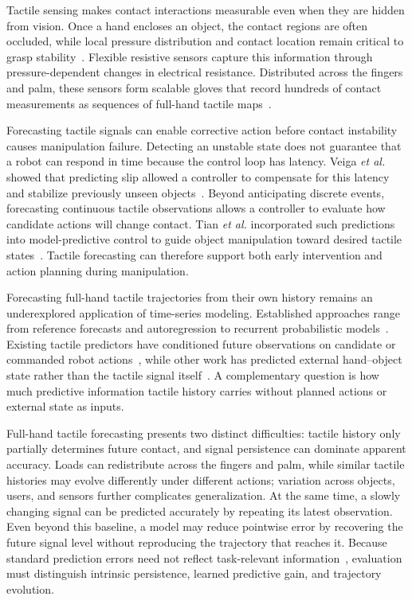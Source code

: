 \documentclass[letterpaper, 10 pt, conference]{ieeeconf}
\begin{document}
Tactile sensing makes contact interactions measurable even when they are hidden from vision. Once a hand encloses an object, the contact regions are often occluded, while local pressure distribution and contact location remain critical to grasp stability~\cite{kappassov2015tactile}. Flexible resistive sensors capture this information through pressure-dependent changes in electrical resistance. Distributed across the fingers and palm, these sensors form scalable gloves that record hundreds of contact measurements as sequences of full-hand tactile maps~\cite{sundaram2019glove}.

Forecasting tactile signals can enable corrective action before contact instability causes manipulation failure. Detecting an unstable state does not guarantee that a robot can respond in time because the control loop has latency. Veiga \emph{et al.} showed that predicting slip allowed a controller to compensate for this latency and stabilize previously unseen objects~\cite{veiga2015stabilizing}. Beyond anticipating discrete events, forecasting continuous tactile observations allows a controller to evaluate how candidate actions will change contact. Tian \emph{et al.} incorporated such predictions into model-predictive control to guide object manipulation toward desired tactile states~\cite{tian2019manipulation}. Tactile forecasting can therefore support both early intervention and action planning during manipulation.

Forecasting full-hand tactile trajectories from their own history remains an underexplored application of time-series modeling. Established approaches range from reference forecasts and autoregression to recurrent probabilistic models~\cite{hyndman2006accuracy,salinas2020deepar}. Existing tactile predictors have conditioned future observations on candidate or commanded robot actions~\cite{tian2019manipulation,mandil2022actp}, while other work has predicted external hand--object state rather than the tactile signal itself~\cite{zhang2021dynamic}. A complementary question is how much predictive information tactile history carries without planned actions or external state as inputs.

Full-hand tactile forecasting presents two distinct difficulties: tactile history only partially determines future contact, and signal persistence can dominate apparent accuracy. Loads can redistribute across the fingers and palm, while similar tactile histories may evolve differently under different actions; variation across objects, users, and sensors further complicates generalization. At the same time, a slowly changing signal can be predicted accurately by repeating its latest observation. Even beyond this baseline, a model may reduce pointwise error by recovering the future signal level without reproducing the trajectory that reaches it. Because standard prediction errors need not reflect task-relevant information~\cite{nunes2020benchmarking,mandil2022actp}, evaluation must distinguish intrinsic persistence, learned predictive gain, and trajectory evolution.
\end{document}
